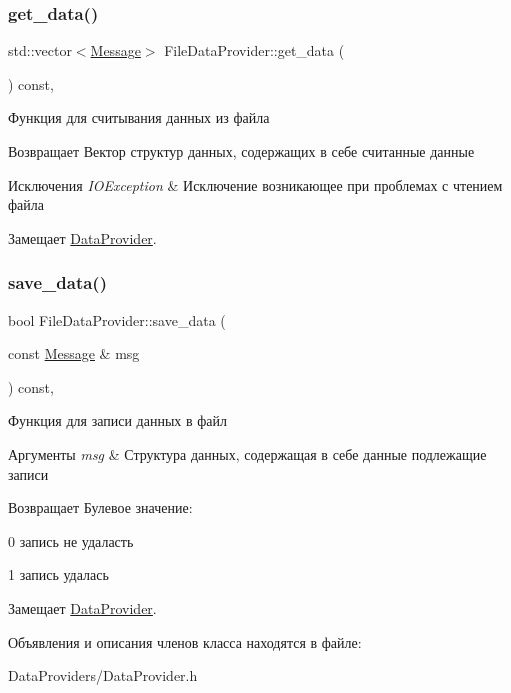 \subsubsection{\texorpdfstring{get\+\_\+data()}{get\_data()}}
{\footnotesize\ttfamily std\+::vector$<$\mbox{\hyperlink{class_message}{Message}}$>$ File\+Data\+Provider\+::get\+\_\+data (\begin{DoxyParamCaption}{ }\end{DoxyParamCaption}) const\hspace{0.3cm}{\ttfamily [override]}, {\ttfamily [virtual]}}



Функция для считывания данных из файла 

\begin{DoxyReturn}{Возвращает}
Вектор структур данных, содержащих в себе считанные данные 
\end{DoxyReturn}

\begin{DoxyExceptions}{Исключения}
{\em I\+O\+Exception} & Исключение возникающее при проблемах с чтением файла \\
\hline
\end{DoxyExceptions}


Замещает \mbox{\hyperlink{class_data_provider}{Data\+Provider}}.

\mbox{\label{class_file_data_provider_aff73a92f2e079094d7b0b0c9829b1ead}} 
\subsubsection{\texorpdfstring{save\+\_\+data()}{save\_data()}}
{\footnotesize\ttfamily bool File\+Data\+Provider\+::save\+\_\+data (\begin{DoxyParamCaption}\item[{const \mbox{\hyperlink{class_message}{Message}} \&}]{msg }\end{DoxyParamCaption}) const\hspace{0.3cm}{\ttfamily [override]}, {\ttfamily [virtual]}}



Функция для записи данных в файл 


\begin{DoxyParams}{Аргументы}
{\em msg} & Структура данных, содержащая в себе данные подлежащие записи \\
\hline
\end{DoxyParams}
\begin{DoxyReturn}{Возвращает}
Булевое значение\+:
\begin{DoxyItemize}
\item 0 запись не удаласть
\item 1 запись удалась 
\end{DoxyItemize}
\end{DoxyReturn}


Замещает \mbox{\hyperlink{class_data_provider}{Data\+Provider}}.



Объявления и описания членов класса находятся в файле\+:\begin{DoxyCompactItemize}
\item 
Data\+Providers/Data\+Provider.\+h\end{DoxyCompactItemize}
